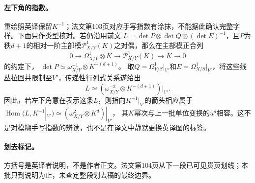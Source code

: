 \documentclass[openany,fontset=fandol]{ctexbook}
\begin{document}
\paragraph{左下角的指数。}
重绘照英译保留$K^{-1}$；法文第103页对应手写指数有涂抹，不能据此确认完整字样。下面只作类型核对。若仍沿用前文
$L=\det P\otimes\det Q\otimes(\det E)^{-1}$，且$P$为秩$d+1$的相对一阶主部模$\mathcal P^1_{X/Y}(K)$之对偶，那么在主部模正合列
\[
0\to\Omega^1_{X/Y}\otimes K
\to\mathcal P^1_{X/Y}(K)\to K\to0
\]
的约定下，
$\det P\simeq \omega_{X/Y}^{-1}\otimes K^{-(d+1)}$。
取$Q=\Omega^1_{Y/S}|_{V'}$和$E=\Omega^1_{X/S}|_{V'}$，将这些线丛拉回并限制至$V'$，传递性行列式关系遂给出
\[
L\simeq
(\omega_{X/Y}^{-2}\otimes K^{-(d+1)})|_{V'}.
\]
因此，若左下角意在表示这条$L$，则指向$K^{-1}|_{V'}$的箭头相应属于
$\operatorname{Hom}(L,K^{-1}|_{V'})
\simeq(\omega_{X/Y}^{2}\otimes K^{d})|_{V'}$，
其$K$幂次与上一批单位变换的$u^d$相容。这不是对模糊手写指数的辨读，也不是在译文中静默更换英译图的标签。

\paragraph{划去标记。}
方括号是英译者说明，不是作者正文。法文第104页从下一段已可见贯页划线；本批只到说明为止，未查定整段划去稿的最终边界。
\end{document}
